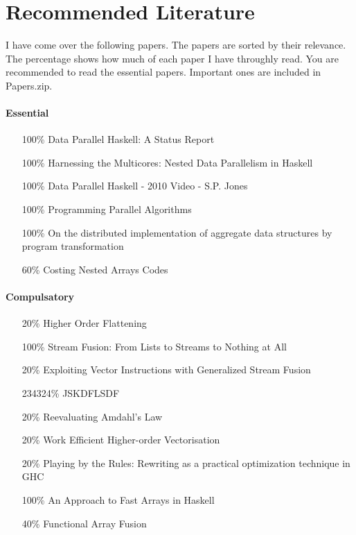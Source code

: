 \documentclass{article}
\begin{document}
  \section{Recommended Literature}
  
    I have come over the following papers.
    The papers are sorted by their relevance.
    The percentage shows how much of each paper I have throughly read.
    You are recommended to read the essential papers. Important ones
    are included in \textrm{Papers.zip}.
    
    \paragraph{Essential}
      \begin{itemize}
        \item[100\%] Data Parallel Haskell: A Status Report \cite{DPHStatus2007}
        \item[100\%] Harnessing the Multicores: Nested Data Parallelism in Haskell \cite{Harness2008}
        \item[100\%] Data Parallel Haskell - 2010 Video - {S.P}. Jones \cite{Simon2010Video}
        \item[100\%] Programming Parallel Algorithms \cite{Blelloch:1996:PPA:227234.227246}
        \item[100\%] On the distributed implementation of aggregate data structures by program transformation \cite{DistTypes1999}
        \item[60\%] Costing Nested Arrays Codes \cite{CostArray2002Leshchinskiy}
      \end{itemize}
      
    \paragraph{Compulsatory}
      \begin{itemize}
        \item[20\%] Higher Order Flattening \cite{HighOrdFlat2006}
        \item[100\%] Stream Fusion: From Lists to Streams to Nothing at All \cite{Fusion2007}
        \item[20\%] Exploiting Vector Instructions with Generalized Stream Fusion \cite{GenVectorFusion2013}
        \item[234324\%] JSKDFLSDF
        \item[20\%] Reevaluating Amdahl's Law \cite{Gustafson1988}
        \item[20\%] Work Efficient Higher-order Vectorisation \cite{EffiVect2012Lipp}
        \item[20\%] Playing by the Rules: Rewriting as a practical optimization technique in GHC \cite{Simon2001Rewrites}
        \item[100\%] An Approach to Fast Arrays in Haskell \cite{FastArr2003Chakravarty}
        \item[40\%] Functional Array Fusion \cite{ArrayFusion2001Chakravarty}
      \end{itemize}
      
\end{document}
